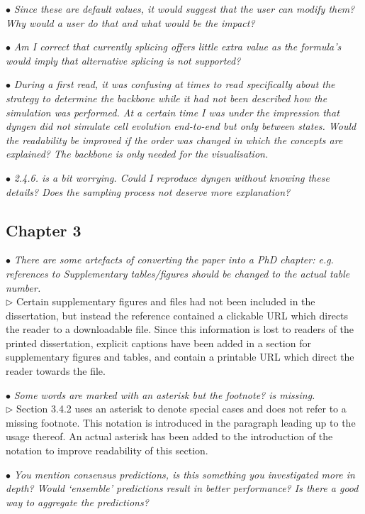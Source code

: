 \documentclass[10pt]{article}
\newcommand{\exam}[2][\  ]{\hspace{0pt}\marginpar{\color{red}#1}$\bullet$ \textit{#2}}
\newcommand{\imp}[1]{{\color{red} #1}}
\newcommand{\answ}[1]{{\color{blue} $\triangleright$ #1}}
\newcommand{\bigexclaim}{\raisebox{-0.1em}{\BigTriangleUp}\hspace{-0.32em}\llap{\small\textbf{!}}\hspace{0.32em}}
\newcommand{\tagimp}{\bigexclaim}
\newcommand{\tagtime}{{\Large $\hourglass$}}
\begin{document}
{{\exam{Since these are default values, it would suggest
		that the user can modify them? Why would a user do that and what would be
		the impact?}
	
\exam{Am I correct that currently splicing offers little extra value as the formula’s
		would imply that alternative splicing is not supported?}


\exam[\tagimp \tagtime]{\imp{During a first read, it was confusing at times to read specifically about the
	strategy to determine the backbone while it had not been described how the
	simulation was performed.} At a certain time I was under the impression that
	dyngen did not simulate cell evolution end-to-end but only between states.
	Would the readability be improved if the order was changed in which the
	concepts are explained? The backbone is only needed for the visualisation.}


\exam{2.4.6. is a bit worrying. Could I reproduce dyngen without knowing these
		details? Does the sampling process not deserve more explanation?}
	



\subsection{Chapter 3}

\exam{There are some artefacts of converting the paper into a PhD chapter: e.g.
	references to Supplementary tables/figures should be changed to the actual
	table number.} \\
\answ{Certain supplementary figures and files had not been included in the dissertation, but instead the reference contained a clickable URL which directs the reader to a downloadable file. Since this information is lost to readers of the printed dissertation, explicit captions have been added in a section for supplementary figures and tables, and contain a printable URL which direct the reader towards the file.}

\exam{Some words are marked with an asterisk but the footnote? is
	missing.} \\
\answ{Section 3.4.2 uses an asterisk to denote special cases and does not refer to a missing footnote. This notation is introduced in the paragraph leading up to the usage thereof. An actual asterisk has been added to the introduction of the notation to improve readability of this section.}

\exam{You mention consensus predictions, is this something you investigated more
		in depth? Would ‘ensemble’ predictions result in better performance? Is there
		a good way to aggregate the predictions?}

}}
\end{document}
